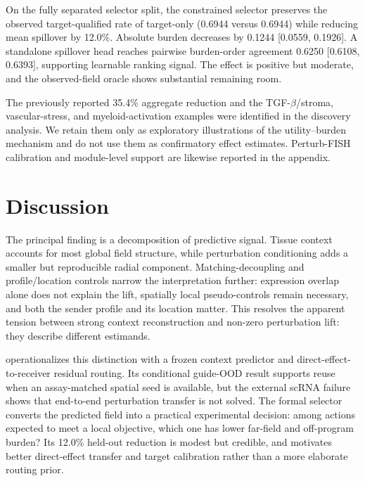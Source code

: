 

On the fully separated selector split, the constrained selector preserves the
observed target-qualified rate of target-only (0.6944 versus 0.6944) while
reducing mean spillover by 12.0\%. Absolute burden decreases by 0.1244
[0.0559, 0.1926]. A standalone \methodname{} spillover head reaches pairwise
burden-order agreement 0.6250 [0.6108, 0.6393], supporting learnable ranking
signal. The effect is positive but moderate, and the observed-field oracle
shows substantial remaining room.

The previously reported 35.4\% aggregate reduction and the
TGF-$\beta$/stroma, vascular-stress, and myeloid-activation examples were
identified in the discovery analysis. We retain them only as exploratory
illustrations of the utility--burden mechanism and do not use them as
confirmatory effect estimates. Perturb-FISH calibration and module-level
support are likewise reported in the appendix.

\clearpage
\section{Discussion}
\label{sec:discussion_conclusion}
The principal finding is a decomposition of predictive signal. Tissue context
accounts for most global field structure, while perturbation conditioning adds
a smaller but reproducible radial component. Matching-decoupling and
profile/location controls narrow the interpretation further: expression
overlap alone does not explain the lift, spatially local pseudo-controls remain
necessary, and both the sender profile and its location matter. This resolves
the apparent tension between strong context reconstruction and non-zero
perturbation lift: they describe different estimands.

\methodname{} operationalizes this distinction with a frozen context predictor
and direct-effect-to-receiver residual routing. Its conditional guide-OOD
result supports reuse when an assay-matched spatial seed is available, but the
external scRNA failure shows that end-to-end perturbation transfer is not
solved. The formal selector converts the predicted field into a practical
experimental decision: among actions expected to meet a local objective, which
one has lower far-field and off-program burden? Its 12.0\% held-out reduction is
modest but credible, and motivates better direct-effect transfer and target
calibration rather than a more elaborate routing prior.

